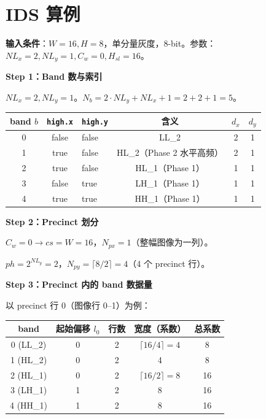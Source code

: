 \section{IDS 算例}

\begin{examplebox}[title={Toy Image 的 Band/Precinct/Packet 完整映射}]

\textbf{输入条件}：$W = 16, H = 8$，单分量灰度，8-bit。参数：$NL_x = 2, NL_y = 1, C_w = 0, H_{sl} = 16$。

\medskip
\textbf{Step 1：Band 数与索引}

$NL_x = 2, NL_y = 1$。$N_b = 2 \cdot NL_y + NL_x + 1 = 2 + 2 + 1 = 5$。

\begin{table}[H]
\centering
\small
\begin{tabular}{@{}cclccc@{}}
\toprule
band $b$ & \texttt{high.x} & \texttt{high.y} & 含义 & $d_x$ & $d_y$ \\
\midrule
0 & false & false & LL\_2 & 2 & 1 \\
1 & true & false & HL\_2（Phase 2 水平高频） & 2 & 1 \\
2 & true & false & HL\_1（Phase 1） & 1 & 1 \\
3 & false & true & LH\_1（Phase 1） & 1 & 1 \\
4 & true & true & HH\_1（Phase 1） & 1 & 1 \\
\bottomrule
\end{tabular}
\end{table}

\textbf{Step 2：Precinct 划分}

$C_w = 0 \to \mathit{cs} = W = 16$，$N_{px} = 1$（整幅图像为一列）。

$\mathit{ph} = 2^{NL_y} = 2$，$N_{py} = \lceil 8/2 \rceil = 4$（4 个 precinct 行）。

\textbf{Step 3：Precinct 内的 band 数据量}

以 precinct 行 0（图像行 0--1）为例：

\begin{table}[H]
\centering
\small
\begin{tabular}{@{}ccccc@{}}
\toprule
band & 起始偏移 $l_0$ & 行数 & 宽度（系数） & 总系数 \\
\midrule
0 (LL\_2) & 0 & 2 & $\lceil 16/4 \rceil = 4$ & 8 \\
1 (HL\_2) & 0 & 2 & 4 & 8 \\
2 (HL\_1) & 0 & 2 & $\lceil 16/2 \rceil = 8$ & 16 \\
3 (LH\_1) & 1 & 2 & 8 & 16 \\
4 (HH\_1) & 1 & 2 & 8 & 16 \\
\bottomrule
\end{tabular}
\end{table}


\end{examplebox}
